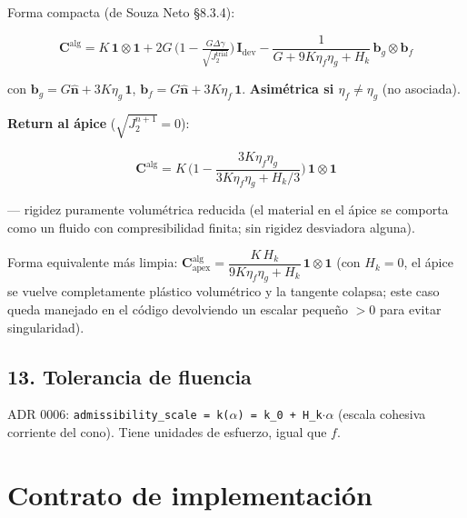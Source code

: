 \documentclass[11pt,letterpaper,oneside]{report}
\begin{document}
Forma compacta (de Souza Neto §8.3.4):

\[
\mathbf C^\text{alg} = K\,\mathbf 1\otimes\mathbf 1 + 2G\,\Big(1 - \tfrac{G\Delta\gamma}{\sqrt{J_2^\text{trial}}}\Big)\,\mathbf I_\text{dev} - \frac{1}{G + 9K\eta_f\eta_g + H_k}\,\mathbf b_g \otimes \mathbf b_f
\]

con $\mathbf b_g = G\hat{\mathbf n} + 3K\eta_g\,\mathbf 1$, $\mathbf b_f = G\hat{\mathbf n} + 3K\eta_f\,\mathbf 1$. \textbf{Asimétrica si $\eta_f \neq \eta_g$} (no asociada).

\textbf{Return al ápice} ($\sqrt{J_2^{n+1}} = 0$):

\[
\mathbf C^\text{alg} = K\,\Big(1 - \frac{3K\eta_f\eta_g}{3K\eta_f\eta_g + H_k/3}\Big)\,\mathbf 1\otimes\mathbf 1
\]

--- rigidez puramente volumétrica reducida (el material en el ápice se comporta como un fluido con compresibilidad finita; sin rigidez desviadora alguna).

Forma equivalente más limpia: $\mathbf C^\text{alg}_\text{apex} = \dfrac{K\,H_k}{9K\eta_f\eta_g + H_k}\,\mathbf 1\otimes\mathbf 1$ (con $H_k=0$, el ápice se vuelve completamente plástico volumétrico y la tangente colapsa; este caso queda manejado en el código devolviendo un escalar pequeño $>0$ para evitar singularidad).

\subsection{13. Tolerancia de fluencia}

ADR 0006: \texttt{admissibility\_scale = k(\ensuremath{\alpha}) = k\_0 + H\_k\ensuremath{\cdot}\ensuremath{\alpha}} (escala cohesiva corriente del cono). Tiene unidades de esfuerzo, igual que $f$.


\section{Contrato de implementación}
\end{document}
